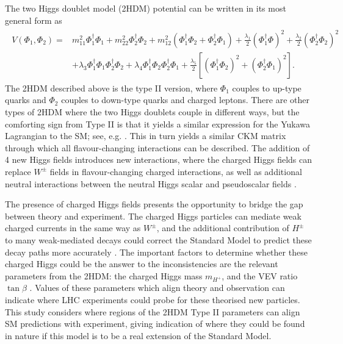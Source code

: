 \documentclass[a4paper,12pt]{article}
\begin{document}
The two Higgs doublet model (2HDM) potential can be written in its most general form as
\begin{align}
    \label{eq:HDMpot}
    \begin{split}
        V(\Phi_1,\Phi_2) =& m_{11}^2\Phi_1^\dagger\Phi_1 + m_{22}^2\Phi_2^\dagger\Phi_2 + m_{12}^2(\Phi_1^\dagger\Phi_2+\Phi_2^\dagger\Phi_1) + \frac{\lambda_1}{2}(\Phi_1^\dagger\Phi)^2 + \frac{\lambda_2}{2}(\Phi_2^\dagger\Phi_2)^2 \\
                                                        &+ \lambda_3\Phi_1^\dagger\Phi_1\Phi_2^\dagger\Phi_2 + \lambda_4\Phi_1^\dagger\Phi_2\Phi_2^\dagger\Phi_1 + \frac{\lambda_5}{2}\left[(\Phi_1^\dagger\Phi_2)^2+(\Phi_2^\dagger\Phi_1)^2\right].
    \end{split}
\end{align}
The 2HDM described above is the type II version, where $\Phi_1$ couples to up-type quarks and $\Phi_2$ couples to down-type quarks and charged leptons. 
There are other types of 2HDM where the two Higgs doublets couple in different ways, but the comforting sign from Type II is that it yields a similar expression for the Yukawa Lagrangian to the SM; see, e.g. \cite{hunter}. 
This in turn yields a similar CKM matrix through which all flavour-changing interactions can be described. 
The addition of 4 new Higgs fields introduces new interactions, where the charged Higgs fields can replace $W^\pm$ fields in flavour-changing charged interactions, as well as additional neutral interactions between the neutral Higgs scalar and pseudoscalar fields \cite{branco}. 

The presence of charged Higgs fields presents the opportunity to bridge the gap between theory and experiment. 
The charged Higgs particles can mediate weak charged currents in the same way as $W^{\pm}$, and the additional contribution of $H^{\pm}$ to many weak-mediated decays could correct the Standard Model to predict these decay paths more accurately \cite{branco}. 
The important factors to determine whether these charged Higgs could be the answer to the inconsistencies are the relevant parameters from the 2HDM: the charged Higgs mass $m_{H^+}$, and the VEV ratio $\tan\beta$ \cite{desc}. 
Values of these parameters which align theory and observation can indicate where LHC experiments could probe for these theorised new particles. 
This study considers where regions of the 2HDM Type II parameters can align SM predictions with experiment, giving indication of where they could be found in nature if this model is to be a real extension of the Standard Model.
\end{document}
